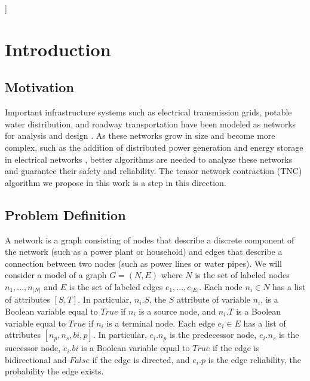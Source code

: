 \documentclass[12pt,twocolumn]{article}
\newcommand{\seven}{\fontsize{7pt}{\baselineskip}\selectfont}    %
\begin{document}
\vspace*{20pt}
]



\BeforeBeginEnvironment{tabularx}{\begin{center}\seven}

\addtolength{\textfloatsep}{-0.25in}
\hypertarget{introduction}{%
\section{Introduction}\label{introduction}}

\hypertarget{motivation}{%
\subsection{Motivation}\label{motivation}}

Important infrastructure systems such as electrical transmission grids, potable water distribution, and roadway transportation have been modeled as networks for analysis and design \cite{levy1967monte} \cite{cotilla2012comparing}. As these networks grow in size and become more complex, such as the addition of distributed power generation and energy storage in electrical networks \cite{escalera2018survey}, better algorithms are needed to analyze these networks and guarantee their safety and reliability. The tensor network contraction (TNC) algorithm we propose in this work is a step in this direction.

\hypertarget{problem-definition}{%
\subsection{Problem Definition}\label{problem-definition}}

A network is a graph consisting of nodes that describe a discrete component of the network (such as a power plant or household) and edges that describe a connection between two nodes (such as power lines or water pipes). We will consider a model of a graph \(G = (N,E)\) where \(N\) is the set of labeled nodes \(n_1,...,n_{|N|}\) and \(E\) is the set of labeled edges \(e_1,...,e_{|E|}\). Each node \(n_i \in N\) has a list of attributes \([S,T]\). In particular, \(n_i.S\), the \(S\) attribute of variable \(n_i\), is a Boolean variable equal to \(True\) if \(n_i\) is a source node, and \(n_i.T\) is a Boolean variable equal to \(True\) if \(n_i\) is a terminal node. Each edge \(e_i \in E\) has a list of attributes \([n_p,n_s,bi,p]\). In particular, \(e_i.n_p\) is the predecessor node, \(e_i.n_s\) is the successor node, \(e_i.bi\) is a Boolean variable equal to \(True\) if the edge is bidirectional and \(False\) if the edge is directed, and \(e_i.p\) is the edge reliability, the probability the edge exists.
\end{document}
